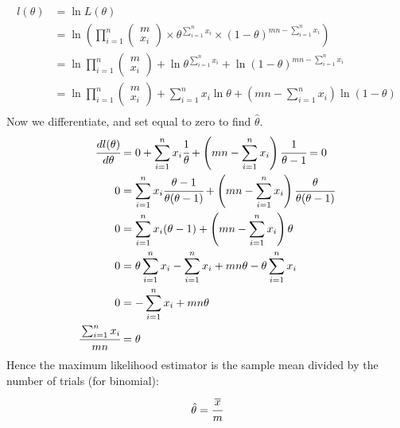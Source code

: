 \documentclass{report}
\begin{document}
            \[\begin{split}
                l(\theta) &= \ln L(\theta) \\
                &= \ln \left( \prod_{i=1}^n \begin{pmatrix}
                    m \\ x_i 
                \end{pmatrix} \times \theta^{\sum_{i=1}^nx_i} \times (1 - \theta)^{mn - \sum_{i=1}^n x_i} \right) \\
                &= \ln \prod_{i=1}^n \begin{pmatrix}
                    m \\ x_i 
                \end{pmatrix} + \ln \theta^{\sum_{i=1}^nx_i} + \ln (1 - \theta)^{mn - \sum_{i=1}^n x_i} \\
                &= \ln \prod_{i=1}^n \begin{pmatrix}
                    m \\ x_i 
                \end{pmatrix} + \sum_{i=1}^nx_i\ln \theta + \left( mn - \sum_{i=1}^n x_i \right)\ln (1 - \theta) \\
            \end{split}\]
            Now we differentiate, and set equal to zero to find $\hat{\theta}$.
            \[\begin{split}
                \cfrac{dl(\theta)}{d\theta} &= 0 + \sum_{i=1}^nx_i\cfrac{1}{\theta} + \left( mn - \sum_{i=1}^n x_i \right)\cfrac{1}{\theta - 1}= 0 \\
                0 & = \sum_{i=1}^nx_i\cfrac{\theta - 1}{\theta(\theta - 1)} + \left( mn - \sum_{i=1}^n x_i \right)\cfrac{\theta}{\theta(\theta - 1)} \\
                0 & = \sum_{i=1}^nx_i (\theta - 1) + \left( mn - \sum_{i=1}^n x_i \right)\theta \\
                0 & = \theta\sum_{i=1}^nx_i - \sum_{i=1}^nx_i + mn\theta - \theta\sum_{i=1}^n x_i  \\
                0 & = - \sum_{i=1}^nx_i + mn\theta  \\
                \cfrac{\sum_{i=1}^nx_i}{mn} & =\theta  \\
            \end{split}\]
            Hence the maximum likelihood estimator is the sample mean divided by the number of trials (for binomial):
            \[\hat{\theta} = \cfrac{\overline{x}}{m}\]
\end{document}

